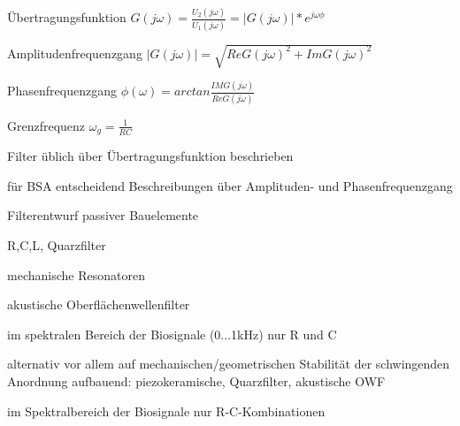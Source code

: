 \documentclass[a4paper]{article}
\begin{document}
\begin{multicols}{3}
\begin{itemize*}
    \item Übertragungsfunktion $G(j\omega)=\frac{U_2(j\omega)}{U_1(j\omega)}=| G(j\omega)|*e^{j\omega\phi}$
    \item Amplitudenfrequenzgang $|G(j\omega)|=\sqrt{Re{G(j\omega)}^2 +Im{G(j\omega)}^2}$
    \item Phasenfrequenzgang $\phi(\omega)=arctan\frac{IM{G(j\omega)}}{Re{G(j\omega)}}$
    \item Grenzfrequenz $\omega_g=\frac{1}{RC}$
    \item Filter üblich über Übertragungsfunktion beschrieben%
    \item für BSA entscheidend Beschreibungen über Amplituden- und Phasenfrequenzgang
  \end{itemize*}

  Filterentwurf passiver Bauelemente
  \begin{itemize*}
    \item R,C,L, Quarzfilter
    \item mechanische Resonatoren
    \item akustische Oberflächenwellenfilter
    \item im spektralen Bereich der Biosignale (0...1kHz) nur R und C
    \item alternativ vor allem auf mechanischen/geometrischen Stabilität der schwingenden Anordnung aufbauend: piezokeramische, Quarzfilter, akustische OWF
    \item im Spektralbereich der Biosignale nur R-C-Kombinationen
  \end{itemize*}


\end{multicols}
\end{document}
